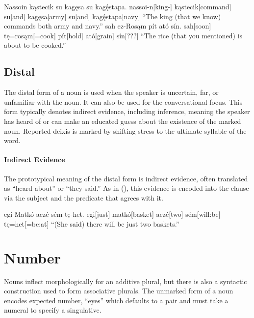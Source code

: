 \begin{gloss*}
    \a \begingl
        \glpreamble Nassoin kąstecik su kagęsa su kagę́stapa. \endpreamble
            nassoi-n[king-]
            kąstecik[command]
            su[and]
            kagęsa[army]
            su[and]
            kagę́stapa[navy]
        \glft “The king (that we know) commands both army and navy.”
    \endgl
    \a \begingl
        \glpreamble sah ez-Rosąm pít ató sín. \endpreamble
            sah[soon]
            tę=rosąm[=cook]
            pít[hold\tbs{}]
            ató[grain\tbs{}]
            sín[???\tbs{}]
        \glft “The rice (that you mentioned) is about to be cooked.”
    \endgl
\end{gloss*}

\subsection{Distal}
The distal form of a noun is used when the speaker is uncertain, far, or unfamiliar with the noun. It can also be used for the conversational focus. This form typically denotes indirect evidence, including inference, meaning the speaker has heard of or can make an educated guess about the existence of the marked noun. Reported deixis is marked by shifting stress to the ultimate syllable of the word.

\paragraph{Indirect Evidence}
The prototypical meaning of the distal form is indirect evidence, often translated as “heard about” or “they said.” As in (\nextx), this evidence is encoded into the clause via the subject and the predicate that agrees with it.

\begin{gloss*}
    \begingl
        \glpreamble egi Matkó aczé sém tę-het.\endpreamble
            egi[just]
            matkó[basket\tbs{}]
            aczé[two\tbs{}]
            sém[will:be\tbs{}]
            tę=het[=be:at]
        \glft “(She said) there will be just two baskets.”
    \endgl
\end{gloss*}

\section{Number}
Nouns inflect morphologically for an additive plural, but there is also a syntactic construction used to form associative plurals. The unmarked form of a noun encodes expected number, \eg {} “eyes” which defaults to a pair and must take a numeral to specify a singulative. 

